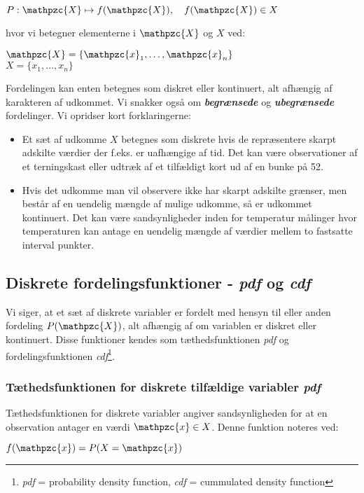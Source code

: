 \documentclass{article}
\newcommand{\mellemrum}{\vspace{2 ex}}
\renewcommand{\mark}[1]{\textit{\textbf{#1}}}
\newcommand{\cent}[1]{ \mellemrum \begin{center} #1\end{center} \mellemrum }
\newcommand{\script}[1]{\mathpzc{#1}}
\begin{document}
	\cent{$P : \script{X} \mapsto f(\script{X}), \quad f(\script{X}) \in X$}
	
	hvor vi betegner elementerne i  $\script{X}$ og $ X $ ved:
	
	\cent{$ \script{X} = \{\script{x}_1,\dots,\script{x}_n\} $ \\ 
	$ X = \{x_1,\dots,x_n\} $}
	
	Fordelingen kan enten betegnes som diskret eller kontinuert, alt afhængig af karakteren af udkommet. Vi snakker også om \mark{begrænsede} og \mark{ubegrænsede} fordelinger. Vi opridser kort forklaringerne:
	\begin{itemize}
		\item Et sæt af udkomme $ X $ betegnes som diskrete hvis de repræsentere skarpt adskilte værdier der f.eks. er uafhængige af tid. Det kan være observationer af et terningskast eller udtræk af et tilfældigt kort ud af en bunke på 52.
		\item Hvis det udkomme man vil observere ikke har skarpt adskilte grænser, men består af en uendelig mængde af mulige udkomme, så er udkommet kontinuert. Det kan være sandsynligheder inden for temperatur målinger hvor temperaturen kan antage en uendelig mængde af værdier mellem to fastsatte interval punkter. 
	\end{itemize}
	
	\subsection{Diskrete fordelingsfunktioner - \textit{pdf} og \textit{cdf}}
	
	Vi siger, at et sæt af diskrete variabler er fordelt med hensyn til eller anden fordeling $ P(\script{X}) $, alt afhængig af om variablen er diskret eller kontinuert. Disse funktioner kendes som tæthedsfunktionen \textit{pdf} og fordelingsfunktionen \textit{cdf}\footnote{\textit{pdf} = probability density function, \textit{cdf} = cummulated density function}.
	
	\subsubsection{Tæthedsfunktionen for diskrete tilfældige variabler \textit{pdf}}
	
	Tæthedsfunktionen for diskrete variabler angiver sandsynligheden for at en observation antager en værdi $\script{x} \in X$. Denne funktion noteres ved:
	
	\cent{$ f(\script{x}) = P(X = \script{x}) $}
	
\end{document}
